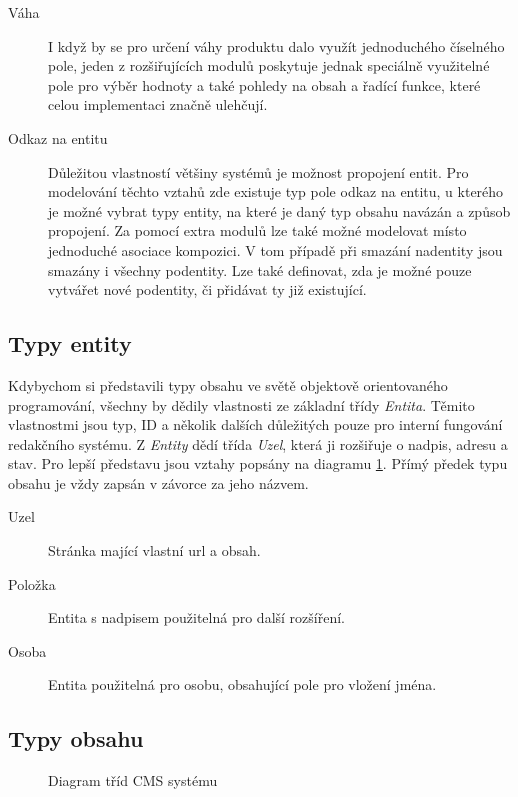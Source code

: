 \begin{description}
  \item[Váha] I když by se pro určení váhy produktu dalo využít jednoduchého číselného pole, jeden z rozšiřujících modulů poskytuje jednak speciálně využitelné pole pro výběr hodnoty a také pohledy na obsah a řadící funkce, které celou implementaci značně ulehčují.
  
  \item[Odkaz na entitu] Důležitou vlastností většiny systémů je možnost propojení entit. Pro modelování těchto vztahů zde existuje typ pole odkaz na entitu, u kterého je možné vybrat typy entity, na které je daný typ obsahu navázán a způsob propojení. Za pomocí extra modulů lze také možné modelovat místo jednoduché asociace kompozici. V tom případě při smazání nadentity jsou smazány i všechny podentity. Lze také definovat, zda je možné pouze vytvářet nové podentity, či přidávat ty již existující.
\end{description}

\subsection{Typy entity}
\label{subsec:typy-entiy}
Kdybychom si představili typy obsahu ve světě objektově orientovaného programování, všechny by dědily vlastnosti ze základní třídy \emph{Entita}. Těmito vlastnostmi jsou typ, ID a několik dalších důležitých pouze pro interní fungování redakčního systému. Z \emph{Entity} dědí třída \emph{Uzel}, která ji rozšiřuje o nadpis, adresu a stav. Pro lepší představu jsou vztahy popsány na diagramu \ref{fig:class-diagram}. Přímý předek typu obsahu je vždy zapsán v závorce za jeho názvem.

\begin{description}
  \item[Uzel] Stránka mající vlastní \gls{url} a obsah.
  \item[Položka] Entita s nadpisem použitelná pro další rozšíření.
  \item[Osoba] Entita použitelná pro osobu, obsahující pole pro vložení jména.
\end{description}

\subsection{Typy obsahu}
\label{subsec:typy-obsahu}

\begin{figure}[htp] 
\caption{Diagram tříd CMS systému}
\label{fig:class-diagram}
\end{figure}  

